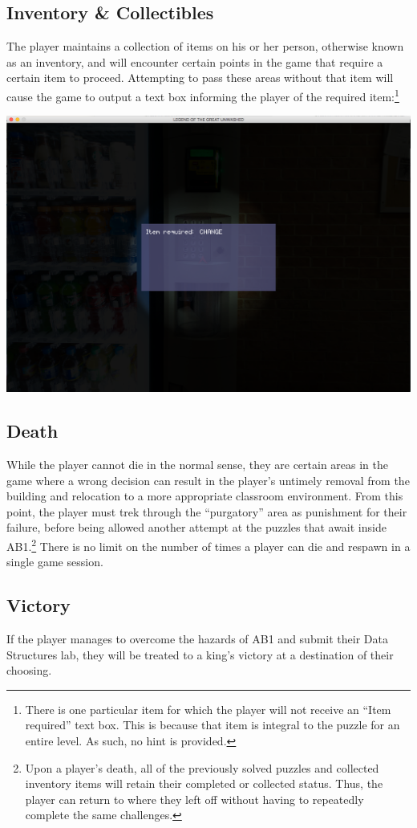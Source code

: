 \documentclass{article}
\begin{document}
	\subsection{Inventory \& Collectibles}
		The player maintains a collection of items on his or her person, otherwise known as an inventory, and will encounter certain points in the game that require a certain item to proceed. Attempting to pass these areas without that item will cause the game to output a text box informing the player of the required item:\footnote{There is one particular item for which the player will not receive an ``Item required'' text box. This is because that item is integral to the puzzle for an entire level. As such, no hint is provided.}
		\begin{center}
			\includegraphics[scale=0.3]{UMimages/invenDemo}
		\end{center}
	\subsection{Death}
		While the player cannot die in the normal sense, they are certain areas in the game where a wrong decision can result in the player's untimely removal from the building and relocation to a more appropriate classroom environment. From this point, the player must trek through the ``purgatory'' area as punishment for their failure, before being allowed another attempt at the puzzles that await inside AB1.\footnote{Upon a player's death, all of the previously solved puzzles and collected inventory items will retain their completed or collected status. Thus, the player can return to where they left off without having to repeatedly complete the same challenges.} There is no limit on the number of times a player can die and respawn in a single game session. 
	\subsection{Victory}
		If the player manages to overcome the hazards of AB1 and submit their Data Structures lab, they will be treated to a king's victory at a destination of their choosing. 
\end{document}
